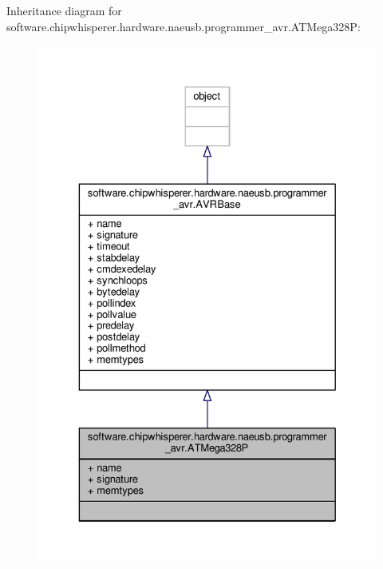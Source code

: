 Inheritance diagram for software.\+chipwhisperer.\+hardware.\+naeusb.\+programmer\+\_\+avr.\+A\+T\+Mega328\+P\+:\nopagebreak
\begin{figure}[H]
\begin{center}
\leavevmode
\includegraphics[width=329pt]{d2/d77/classsoftware_1_1chipwhisperer_1_1hardware_1_1naeusb_1_1programmer__avr_1_1ATMega328P__inherit__graph}
\end{center}
\end{figure}


